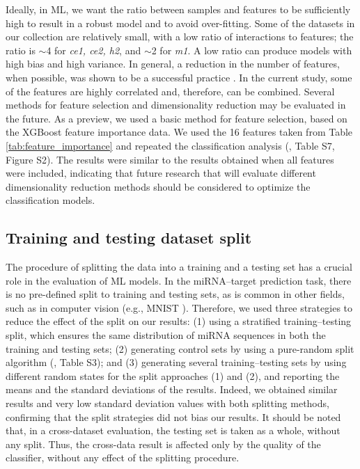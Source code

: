 \documentclass{bmcart}
\begin{document}
Ideally, in ML, we want the ratio between samples and features to be sufficiently high to result in a robust model and to avoid over-fitting. Some of the datasets in our collection are relatively small, with a low ratio of interactions to features; the ratio is $\sim$4 for \textit{ce1, ce2, h2}, and $\sim$2 for \textit{m1}. A low ratio can produce models with high bias and high variance. In general, a reduction in the number of features, when possible, was shown to be a successful practice \cite{blum1997selection}. In the current study, some of the features are highly correlated and, therefore, can be combined. Several methods for feature selection and dimensionality reduction may be evaluated in the future. As a preview, we used a basic method for feature selection, based on the XGBoost feature importance data. We used the 16 features taken from Table \ref{tab:feature_importance} and repeated the classification analysis (, Table S7, Figure S2). The results were similar to the results obtained when all features were included, indicating that future research that will evaluate different dimensionality reduction methods should be considered to optimize the classification models. 

\subsection*{Training and testing dataset split} 
The procedure of splitting the data into a training and a testing set has a crucial role in the evaluation of ML models. In the miRNA--target prediction task, there is no pre-defined split to training and testing sets, as is common in other fields, such as in computer vision (e.g., MNIST \cite{mnist10027939599}). Therefore, we used three strategies to reduce the effect of the split on our results: (1) using a stratified training--testing split, which ensures the same distribution of miRNA sequences in both the training and testing sets; (2) generating control sets by using a pure-random split algorithm (, Table S3); and (3) generating several training--testing sets by using different random states for the split approaches (1) and (2),  and reporting the means and the standard deviations of the results. Indeed, we obtained similar results and very low standard deviation values with both splitting methods, confirming that the split strategies did not bias our results.
It should be noted that, in a cross-dataset evaluation, the testing set is taken as a whole, without any split. Thus, the cross-data result is affected only by the quality of the classifier, without any effect of the splitting procedure.
\end{document}
